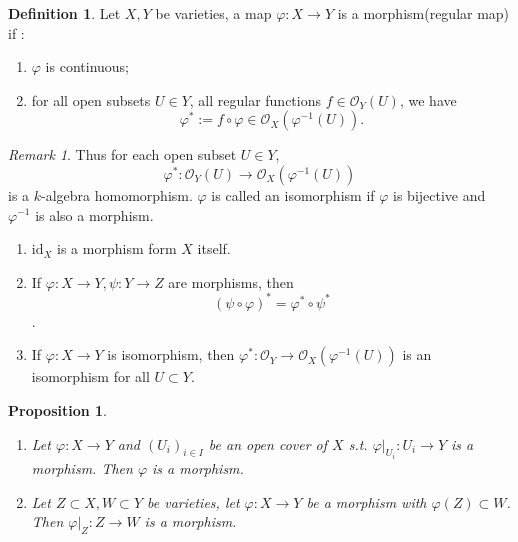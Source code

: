\documentclass{amsart}
\theoremstyle{plain}
\newtheorem{proposition}{Proposition}
\theoremstyle{definition}
\newtheorem{definition}{Definition}
\theoremstyle{remark}
\newtheorem*{remark}{Remark}
\numberwithin{equation}{section}
\begin{document}
\begin{definition}\label{11}
	Let $ X,Y $ be varieties, a map $ \varphi :X\to Y $ is a morphism(regular map) if :\begin{enumerate}
		\item $ \varphi $ is continuous;
		\item for all open subsets $ U\in Y $, all regular functions $ f\in \mathcal{O}_Y(U) $, we have 
		$$
		\varphi^\ast := f\circ \varphi \in \mathcal{O}_X(\varphi^{-1}(U)).
		$$
	\end{enumerate}
\end{definition}
\begin{remark}
			Thus for each open subset $ U\in Y $, 
			$$
			\varphi^\ast :\mathcal{O}_Y(U)\to \mathcal{O}_X(\varphi^{-1}(U))
			$$
			is a $ k $-algebra homomorphism. $ \varphi $ is called an isomorphism if $ \varphi $ is bijective and $ \varphi^{-1} $ is also a morphism.
				\begin{enumerate}
					\item $ \text{id}_X $ is a morphism form $ X $ itself.
					\item If $ \varphi:X\to Y,\psi :Y\to Z $ are morphisms, then 
					$$
					(\psi\circ\varphi)^\ast = \varphi^\ast \circ \psi^\ast
					$$.
					\item If $ \varphi : X\to Y $ is isomorphism, then $ \varphi^\ast: \mathcal{O}_Y\to \mathcal{O}_X(\varphi^{-1}(U)) $ is an  isomorphism for all $ U\subset Y $.
 				\end{enumerate}
\end{remark}
\begin{proposition}
	\begin{enumerate}
		\item Let $ \varphi :X\to Y $ and $ (U_i)_{i\in I} $ be an open cover of $ X $ s.t. $ \varphi |_{U_i}:U_i\to Y $ is a morphism. Then $ \varphi  $ is a morphism.
		\item Let $ Z\subset X, W\subset Y $ be varieties, let $ \varphi:X\to Y $ be a morphism with $ \varphi(Z)\subset W $. Then $ \varphi|_Z:Z\to W $ is a morphism.
	\end{enumerate}
\end{proposition}
\end{document}
